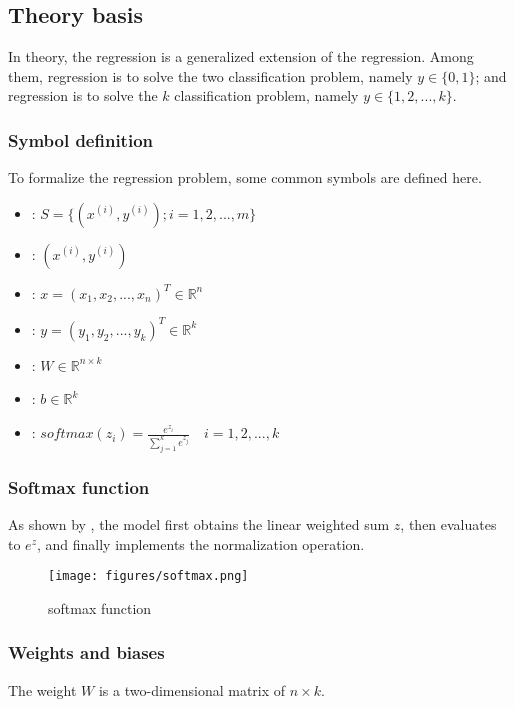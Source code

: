 \begin{content}
\begin{content}
\subsection{Theory basis}
In theory, the  regression is a generalized extension of the  regression. Among them,  regression is to solve the two classification problem, namely $y \in \{0,1\}$; and  regression is to solve the $k$ classification problem, namely $y \in \{1,2,...,k\}$.


\subsubsection{Symbol definition}
To formalize the  regression problem, some common symbols are defined here.
\begin{itemize}
  \item {}: $ S = \{ ({x^{(i)}},{y^{(i)}});i = 1,2,...,m\} $
  \item {}: $ ({x^{(i)}},{y^{(i)}}) $
  \item {}: $ x = ({x_1},{x_2},...,{x_n})^{T}  \in {\mathbb{R}^n} $
  \item {}: $ y = ({y_1},{y_2},...,{y_k})^{T} \in {\mathbb{R}^k} $
  \item {}: $ W \in {\mathbb{R}^{n \times k}} $ 
  \item {}: $ b \in {\mathbb{R}^k} $ 
  \item {}: $softmax {(z_i)} = \tfrac{{{e^{{z_i}}}}}{{\sum\limits_{j = 1}^k {{e^{{z_j}}}}}} \quad i = 1,2,...,k$
\end{itemize}


\subsubsection{Softmax function}
As shown by , the model first obtains the linear weighted sum $z$, then evaluates to $e^z$, and finally implements the normalization operation.

\begin{figure}[H]
  \centering
  \texttt{[image: figures/softmax.png]}
  \caption{softmax function}
  \label{fig:softmax}
\end{figure}


\subsubsection{Weights and biases}
The weight $W$ is a two-dimensional matrix of $n \times k$.


\end{content}
\end{content}
